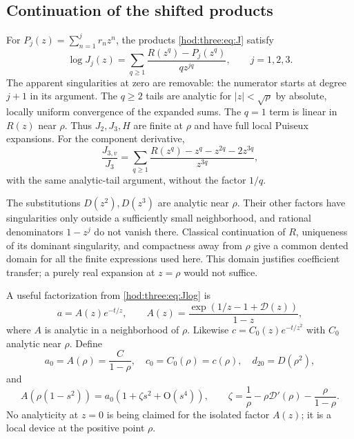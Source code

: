 \documentclass[11pt,letterpaper]{article}
\theoremstyle{definition}\newtheorem{definition}[theorem]{Definition}
\theoremstyle{remark}\newtheorem{remark}[theorem]{Remark}
\newcommand{\Dcal}{\mathcal D}
\newcommand{\OO}{\mathrm O}
\begin{document}
\subsection{Continuation of the shifted products}
For $P_j(z)=\sum_{n=1}^j r_nz^n$, the products \eqref{hod:three:eq:J} satisfy
\begin{equation}\label{hod:three:eq:Jlog}
\log J_j(z)=\sum_{q\ge1}\frac{R(z^q)-P_j(z^q)}{qz^{jq}},\qquad j=1,2,3.
\end{equation}
The apparent singularities at zero are removable: the numerator starts at degree $j+1$ in its argument. The $q\ge2$ tails are analytic for $|z|<\sqrt\rho$ by absolute, locally uniform convergence of the expanded sums. The $q=1$ term is linear in $R(z)$ near $\rho$. Thus $J_2,J_3,H$ are finite at $\rho$ and have full local Puiseux expansions. For the component derivative,
\begin{equation}\label{hod:three:eq:Jvlog}
\frac{J_{3,v}}{J_3}=\sum_{q\ge1}\frac{R(z^q)-z^q-z^{2q}-2z^{3q}}{z^{3q}},
\end{equation}
with the same analytic-tail argument, without the factor $1/q$.

The substitutions $D(z^2),D(z^3)$ are analytic near $\rho$. Their other factors have singularities only outside a sufficiently small neighborhood, and rational denominators $1-z^j$ do not vanish there. Classical continuation of $R$, uniqueness of its dominant singularity, and compactness away from $\rho$ give a common dented domain for all the finite expressions used here. This domain justifies coefficient transfer; a purely real expansion at $z=\rho$ would not suffice.

A useful factorization from \eqref{hod:three:eq:Jlog} is
\begin{equation}\label{hod:three:eq:afactor}
a=A(z)e^{-t/z},\qquad
A(z)=\frac{\exp(1/z-1+\Dcal(z))}{1-z},
\end{equation}
where $A$ is analytic in a neighborhood of $\rho$. Likewise $c=C_0(z)e^{-t/z^2}$ with $C_0$ analytic near $\rho$. Define
\begin{equation}\label{hod:three:eq:a0zeta}
a_0=A(\rho)=\frac C{1-\rho},\quad c_0=C_0(\rho)=c(\rho),\quad
d_{20}=D(\rho^2),
\end{equation}
and
\begin{equation}\label{hod:three:eq:zeta}
A(\rho(1-s^2))=a_0(1+\zeta s^2+\OO(s^4)),\qquad
\zeta=\frac1\rho-\rho\Dcal'(\rho)-\frac\rho{1-\rho}.
\end{equation}
No analyticity at $z=0$ is being claimed for the isolated factor $A(z)$; it is a local device at the positive point $\rho$.
\end{document}
